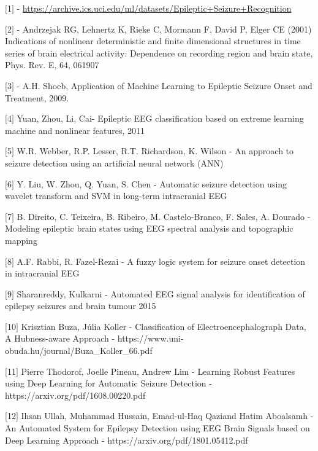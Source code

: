 \documentclass{llncs}       %
\begin{document}
\begin{thebibliography}{}
%
%



$[$1$]$ - \underline{https://archive.ics.uci.edu/ml/datasets/Epileptic+Seizure+Recognition}

$[$2$]$ - Andrzejak RG, Lehnertz K, Rieke C, Mormann F, David P, Elger 
CE (2001) Indications of nonlinear deterministic and finite dimensional 
structures in time series of brain electrical activity: Dependence on 
recording region and brain state, Phys. Rev. E, 64, 061907

$[$3$]$ - A.H. Shoeb, Application of Machine Learning to Epileptic 
Seizure Onset and Treatment, 2009.

$[$4$]$ Yuan, Zhou, Li, Cai- Epileptic EEG classification based on extreme learning machine and nonlinear features, 2011

$[$5$]$ W.R. Webber, R.P. Lesser, R.T. Richardson, K. Wilson - An 
approach to seizure detection using an artificial neural network (ANN)

$[$6$]$ Y. Liu, W. Zhou, Q. Yuan, S. Chen - Automatic seizure detection 
using wavelet transform and SVM in long-term intracranial EEG

$[$7$]$ B. Direito, C. Teixeira, B. Ribeiro, M. Castelo-Branco, F. 
Sales, A. Dourado - Modeling epileptic brain states using EEG spectral 
analysis and topographic mapping

$[$8$]$ A.F. Rabbi, R. Fazel-Rezai - A fuzzy logic system for seizure 
onset detection in intracranial EEG

$[$9$]$ Sharanreddy, Kulkarni - Automated EEG signal analysis for identification of epilepsy seizures and brain tumour   2015 

$[$10$]$ Krisztian Buza, Júlia Koller - Classification of Electroencephalograph Data,
A Hubness-aware Approach - https://www.uni-obuda.hu/journal/Buza\_Koller\_66.pdf

$[$11$]$ Pierre Thodorof, Joelle Pineau, Andrew Lim - Learning Robust Features using Deep Learning for Automatic Seizure Detection - https://arxiv.org/pdf/1608.00220.pdf

$[$12$]$ Ihsan Ullah, Muhammad Hussain, Emad-ul-Haq Qaziand Hatim Aboalsamh - An Automated System for Epilepsy Detection using EEG Brain Signals
based on Deep Learning Approach - https://arxiv.org/pdf/1801.05412.pdf


\end{thebibliography}
\end{document}
